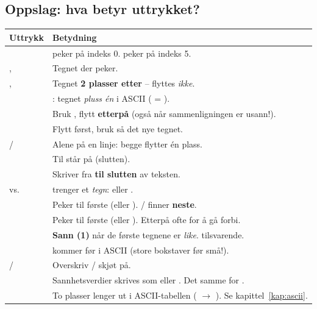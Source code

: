 \subsection{Oppslag: hva betyr uttrykket?}
\begin{center}
\begin{longtable}{@{}L{3.9cm}L{11.7cm}@{}}
\toprule
\textbf{Uttrykk} & \textbf{Betydning} \\
\midrule
\endhead
{} &  peker på indeks 0.  peker på indeks 5. \\
,  & Tegnet der  peker. \\
,  & Tegnet \textbf{2 plasser etter}  --  flyttes \emph{ikke}. \\
 & : tegnet \emph{pluss én} i ASCII ( = ). \\
 & Bruk , flytt  \textbf{etterpå} (også når sammenligningen er usann!). \\
 & Flytt  først, bruk så det nye tegnet. \\
 /  & Alene på en linje: begge flytter  én plass. \\
 & Til  står på  (slutten). \\
 & Skriver fra  \textbf{til slutten} av teksten. \\
 vs.\  &  trenger et \emph{tegn}:  eller . \\
 & Peker til første  (eller ).  /  finner \textbf{neste}. \\
 & Peker til første  (eller ). Etterpå ofte  for å gå forbi. \\
 & \textbf{Sann (1)} når de  første tegnene er \emph{like}.  tilsvarende. \\
 &  kommer før  i ASCII (store bokstaver før små!). \\
 /  & Overskriv / skjøt på. \\
 & Sannhetsverdier skrives som  eller . Det samme for . \\
 & To plasser lenger ut i ASCII-tabellen ( $\rightarrow$ ). Se kapittel~\ref{kap:ascii}. \\

\end{longtable}
\end{center}
